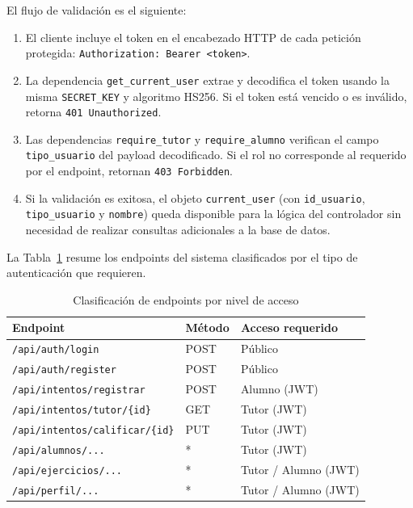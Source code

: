 El flujo de validación es el siguiente:
 
\begin{enumerate}
    \item El cliente incluye el token en el encabezado HTTP de cada
    petición protegida: \texttt{Authorization: Bearer <token>}.
    \item La dependencia \texttt{get\_current\_user} extrae y decodifica
    el token usando la misma \texttt{SECRET\_KEY} y algoritmo HS256. Si
    el token está vencido o es inválido, retorna \texttt{401 Unauthorized}.
    \item Las dependencias \texttt{require\_tutor} y
    \texttt{require\_alumno} verifican el campo \texttt{tipo\_usuario}
    del payload decodificado. Si el rol no corresponde al requerido por
    el endpoint, retornan \texttt{403 Forbidden}.
    \item Si la validación es exitosa, el objeto \texttt{current\_user}
    (con \texttt{id\_usuario}, \texttt{tipo\_usuario} y \texttt{nombre})
    queda disponible para la lógica del controlador sin necesidad de
    realizar consultas adicionales a la base de datos.
\end{enumerate}
 
La Tabla~\ref{tab:endpoints-auth} resume los endpoints del sistema
clasificados por el tipo de autenticación que requieren.
 
\begin{table}[H]
\centering
\caption{Clasificación de endpoints por nivel de acceso}
\label{tab:endpoints-auth}
\begin{tabular}{|l|l|l|}
\hline
\textbf{Endpoint} & \textbf{Método} & \textbf{Acceso requerido} \\
\hline
\texttt{/api/auth/login}              & POST & Público \\
\texttt{/api/auth/register}           & POST & Público \\
\texttt{/api/intentos/registrar}      & POST & Alumno (JWT) \\
\texttt{/api/intentos/tutor/\{id\}}   & GET  & Tutor (JWT) \\
\texttt{/api/intentos/calificar/\{id\}} & PUT & Tutor (JWT) \\
\texttt{/api/alumnos/...}             & *    & Tutor (JWT) \\
\texttt{/api/ejercicios/...}          & *    & Tutor / Alumno (JWT) \\
\texttt{/api/perfil/...}              & *    & Tutor / Alumno (JWT) \\
\hline
\end{tabular}
\end{table}